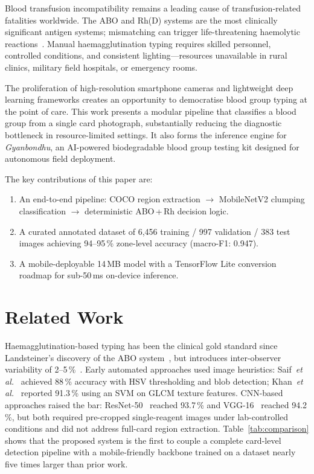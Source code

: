 \documentclass[conference]{IEEEtran}
\begin{document}
Blood transfusion incompatibility remains a leading cause of
transfusion-related fatalities worldwide.
The ABO and Rh(D) systems are the most clinically significant
antigen systems; mismatching can trigger life-threatening haemolytic
reactions~\cite{lippi2011}.
Manual haemagglutination typing requires skilled personnel,
controlled conditions, and consistent lighting---resources unavailable
in rural clinics, military field hospitals, or emergency rooms.

The proliferation of high-resolution smartphone cameras and lightweight
deep learning frameworks creates an opportunity to democratise blood
group typing at the point of care.
This work presents a modular pipeline that classifies a blood group
from a single card photograph, substantially reducing the diagnostic
bottleneck in resource-limited settings.
It also forms the inference engine for \emph{Gyanbondhu}, an
AI-powered biodegradable blood group testing kit designed for
autonomous field deployment.

The key contributions of this paper are:
\begin{enumerate}
  \item An end-to-end pipeline: COCO region extraction
        $\rightarrow$ MobileNetV2 clumping classification
        $\rightarrow$ deterministic ABO\,+\,Rh decision logic.
  \item A curated annotated dataset of 6,456 training / 997
        validation / 383 test images achieving 94--95\,\%
        zone-level accuracy (macro-F1: 0.947).
  \item A mobile-deployable 14\,MB model with a TensorFlow Lite
        conversion roadmap for sub-50\,ms on-device inference.
\end{enumerate}

\section{Related Work}

Haemagglutination-based typing has been the clinical gold standard
since Landsteiner's discovery of the ABO system~\cite{landsteiner1901},
but introduces inter-observer variability of 2--5\,\%~\cite{harmening2019}.
Early automated approaches used image heuristics: Saif~\emph{et al.}~\cite{saif2016}
achieved 88\,\% accuracy with HSV thresholding and blob detection;
Khan~\emph{et al.}~\cite{khan2018}
reported 91.3\,\% using an SVM on GLCM texture features.
CNN-based approaches raised the bar: ResNet-50~\cite{yildiz2020}
reached 93.7\,\% and VGG-16~\cite{ahmed2021} reached 94.2\,\%, but
both required pre-cropped single-reagent images under lab-controlled
conditions and did not address full-card region extraction.
Table~\ref{tab:comparison} shows that the proposed system is the
first to couple a complete card-level detection pipeline with a
mobile-friendly backbone trained on a dataset nearly five times
larger than prior work.
\end{document}
